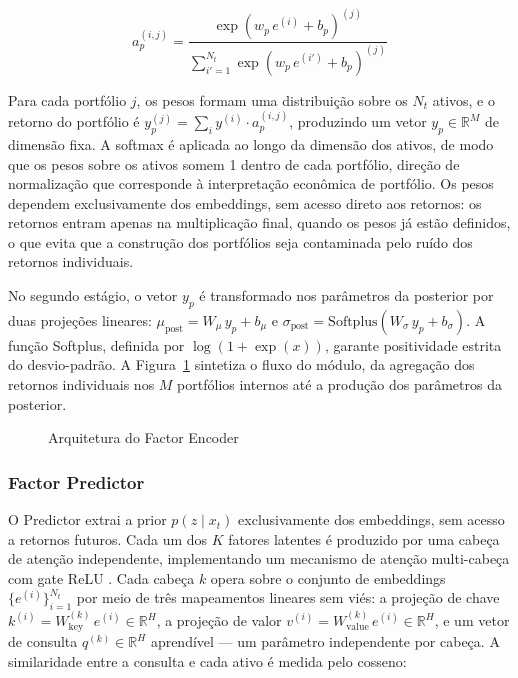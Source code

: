 \begin{equation}
    a_p^{(i,j)} = \frac{\exp\left(w_p\, e^{(i)} + b_p\right)^{(j)}}{\sum_{i'=1}^{N_t}
    \exp\left(w_p\, e^{(i')} + b_p\right)^{(j)}}
    \label{eq:portfolio-weights}
\end{equation}

Para cada portfólio $j$, os pesos formam uma distribuição sobre os $N_t$ ativos, e o
retorno do portfólio é $y_p^{(j)} = \sum_i y^{(i)} \cdot a_p^{(i,j)}$, produzindo um
vetor $y_p \in \mathbb{R}^M$ de dimensão fixa. A softmax é aplicada ao longo da
dimensão dos ativos, de modo que os pesos sobre os ativos somem 1 dentro de cada
portfólio, direção de normalização que corresponde à interpretação econômica de
portfólio. Os pesos dependem exclusivamente dos embeddings, sem acesso direto aos
retornos: os retornos entram apenas na multiplicação final, quando os pesos já estão
definidos, o que evita que a construção dos portfólios seja contaminada pelo ruído dos
retornos individuais.

No segundo estágio, o vetor $y_p$ é transformado nos parâmetros da posterior por duas
projeções lineares: $\mu_{\text{post}} = W_\mu \, y_p + b_\mu$ e $\sigma_{\text{post}}
= \text{Softplus}(W_\sigma \, y_p + b_\sigma)$. A função Softplus, definida por
$\log(1 + \exp(x))$, garante positividade estrita do desvio-padrão. A
Figura~\ref{fig:encoder} sintetiza o fluxo do módulo, da agregação dos retornos
individuais nos $M$ portfólios internos até a produção dos parâmetros da posterior.

\begin{figure}[ht]
    \centering
    
    \caption{Arquitetura do Factor Encoder}
    \label{fig:encoder}
\end{figure}

\subsubsection{Factor Predictor}
O Predictor extrai a prior $p(z \mid x_t)$ exclusivamente dos embeddings, sem acesso a
retornos futuros. Cada um dos $K$ fatores latentes é produzido por uma cabeça de
atenção independente, implementando um mecanismo de atenção multi-cabeça com gate ReLU
\parencite{duan2022}. Cada cabeça $k$ opera sobre o conjunto de embeddings
$\{e^{(i)}\}_{i=1}^{N_t}$ por meio de três mapeamentos lineares sem viés: a projeção
de chave $k^{(i)} = W_{\text{key}}^{(k)}\, e^{(i)} \in \mathbb{R}^H$, a projeção de
valor $v^{(i)} = W_{\text{value}}^{(k)}\, e^{(i)} \in \mathbb{R}^H$, e um vetor de
consulta $q^{(k)} \in \mathbb{R}^H$ aprendível --- um parâmetro independente por
cabeça. A similaridade entre a consulta e cada ativo é medida pelo cosseno:

